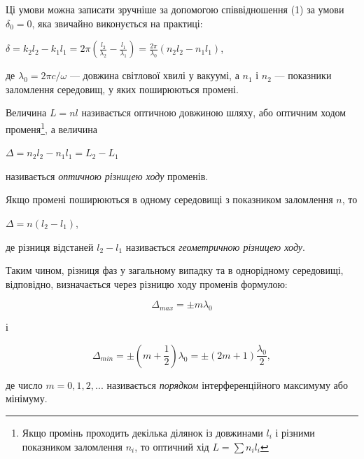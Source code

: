 \documentclass[12pt,a4paper]{article}
\begin{document}
    Ці умови можна записати зручніше за допомогою співвідношення (1) за умови
    $\delta_0 = 0$, яка звичайно виконується на практиці:

    \begin{center}
        $\displaystyle \delta = k_2 l_2 - k_1 l_1 = 2\pi \left( \frac{l_2}{\lambda_2} - \frac{l_1}{\lambda_1} \right) = 
        \frac{2\pi}{\lambda_0} \left( n_2 l_2 - n_1 l_1 \right)$,
    \end{center}

    де $\lambda_0 = 2\pi c/\omega$ --- довжина світлової хвилі у вакуумі, а $n_1$ і $n_2$ --- показники заломлення середовищ, у яких поширюються промені.

    \newpage

    Величина $L = nl$ називається оптичною довжиною шляху, або оптичним ходом променя\footnote{Якщо промінь проходить
    декілька ділянок із довжинами $l_i$ і різними показником заломлення $n_i$, то оптичний хід $L = \sum n_i l_i$},
    а величина

    \begin{center}
        $\Delta = n_2 l_2 - n_1 l_1 = L_2 - L_1$
    \end{center}

    називається \textit{оптичною різницею ходу} променів.

    Якщо промені поширюються в одному середовищі з показником заломлення $n$, то

    \begin{center}
        $\Delta = n(l_2 - l_1)$,
    \end{center}

    де різниця відстаней $l_2 - l_1$ називається \textit{геометричною різницею ходу}.

    Таким чином, різниця фаз у загальному випадку та в однорідному середовищі,
    відповідно, визначається через різницю ходу променів формулою:

    \begin{equation}
        \Delta_{max} = \pm m \lambda_0
        \tag{6}
    \end{equation}

    і

    \begin{equation}
        \Delta_{min} = \pm \left( m + \frac{1}{2} \right) \lambda_0 = \pm \left( 2m + 1 \right) \frac{\lambda_0}{2},
        \tag{6а}
    \end{equation}

    де число $m = 0, 1, 2, ...$ називається \textit{порядком} інтерференційного максимуму або мінімуму.
\end{document}
